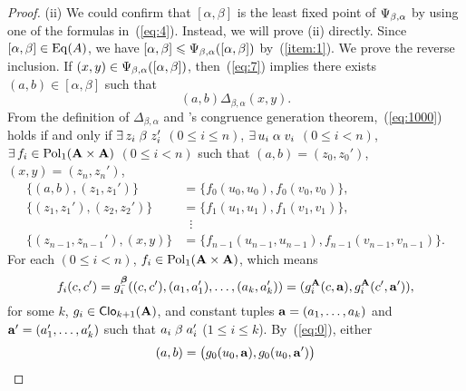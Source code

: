 \begin{proof}
  \noindent (ii) We could confirm that
  $[\alpha, \beta]$ is the least fixed point of $\Psi_{\beta, \alpha}$ by using one of the
  formulas in~(\ref{eq:4}).  Instead, we will prove (ii) directly.
  Since $[\alpha, \beta] \in \operatorname{Eq}(A)$,
  we have $[\alpha, \beta] \leqslant \Psi_{\beta, \alpha}([\alpha, \beta])$
  by~(\ref{item:1}).
  We prove the reverse inclusion.
  If $(x,y)\in \Psi_{\beta, \alpha}([\alpha, \beta])$, then~(\ref{eq:7})
  implies there exists $(a,b)\in [\alpha, \beta]$ such that
    \begin{equation}
      \label{eq:1000}
     (a,b) \mathrel{\Delta_{\beta, \alpha}} (x,y).
    \end{equation}
    From the definition of $\Delta_{\beta, \alpha}$ and 
    \malcev's congruence generation theorem,~(\ref{eq:1000})
    holds if and only if
    $\exists \, z_i \mathrel{\beta} z_i'$ $(0\leq i \leq n)$,
    $\exists \, u_i \mathrel{\alpha} v_i$ $(0\leq i < n)$,
    $\exists\, f_i \in \operatorname{Pol}_1(\mathbf{A}\times \mathbf{A})$ $(0\leq i < n)$
    such that
    $(a, b) = (z_0,z_0')$,
    $(x, y)=(z_n,z_n')$,
    \begin{align}
      \label{eq:0}
      \{(a, b),(z_1,z_1')\} &= \{f_0(u_0,u_0), f_0(v_0,v_0)\},\\
      \label{eq:1}
      \{(z_1,z_1'),(z_2,z_2')\} &= \{f_1(u_1,u_1), f_1(v_1,v_1)\},\\
      \nonumber
      &\; \; \vdots\\
      \nonumber
      \{(z_{n-1},z_{n-1}'),(x, y)\} &= \{f_{n-1}(u_{n-1},u_{n-1}), f_{n-1}(v_{n-1},v_{n-1})\}.
    \end{align}
    For each $(0\leq i < n)$, $f_i \in \operatorname{Pol}_1(\mathbf{A}\times \mathbf{A})$, which means
    \newcommand\gA{\ensuremath{g^{\bA}}}%
    \[      f_i(c, c') = g_i^{\bbeta}((c, c'), (a_1, a_1'), \dots, (a_k, a_k') )
      = (g_i^{\bA}(c, \ba), g_i^{\bA}(c', \ba')),%
      \]%
    \renewcommand\gA{\ensuremath{g}}%
    for some $k$, $\gA_i \in \sansClo_{k+1}(\bA)$, and constant tuples
    $\mathbf{a} = (a_1, \dots, a_k)$ and $\mathbf{a}' = (a_1', \dots, a_k')$ such that
    $a_i \mathrel{\beta} a_i'$ ($1\leq i\leq k$). 
    By~(\ref{eq:0}), either
    \[
    (a, b) = \bigl(\gA_0(u_0, \ba), \gA_0(u_0, \ba')\bigr)
\]
\end{proof}
